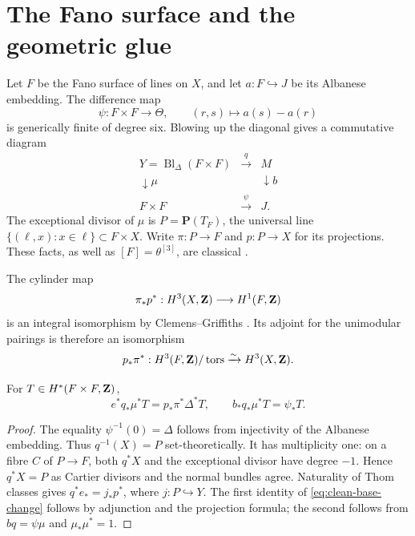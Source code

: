 \section{The Fano surface and the geometric glue}\label{sec:geometric-glue}

Let \(F\) be the Fano surface of lines on \(X\), and let
\(a:F\hookrightarrow J\) be its Albanese embedding.  The difference map
\[
 \psi:F\times F\longrightarrow\Theta,
 \qquad (r,s)\longmapsto a(s)-a(r)
\]
is generically finite of degree six.  Blowing up the diagonal gives a
commutative diagram
\[
 \begin{array}{ccc}
 Y=\operatorname{Bl}_{\Delta}(F\times F)&\xrightarrow{q}&M\\
 \downarrow\mu&&\downarrow b\\
 F\times F&\xrightarrow{\psi}&J.
 \end{array}
\]
The exceptional divisor of \(\mu\) is
\(P=\mathbf P(T_F)\), the universal line
\(\{(\ell,x):x\in\ell\}\subset F\times X\).  Write
\(\pi:P\to F\) and \(p:P\to X\) for its projections.  These facts, as
well as \([F]=\theta^{[3]}\), are classical
\cite{ClemensGriffiths,BeauvilleTheta}.

The cylinder map
\[
 \pi_*p^*:H^3(X,\mathbf Z)\longrightarrow H^1(F,\mathbf Z)
\]
is an integral isomorphism by Clemens--Griffiths
\cite[\S2 and \S11]{ClemensGriffiths}.  Its adjoint for the unimodular
pairings is therefore an isomorphism
\begin{equation}\label{eq:cylinder-adjoint}
 p_*\pi^*:H^3(F,\mathbf Z)/\operatorname{tors}
 \xrightarrow{\sim}H^3(X,\mathbf Z).
\end{equation}

\begin{lemma}\label{lem:clean-base-change}
For \(T\in H^*(F\times F,\mathbf Z)\),
\begin{equation}\label{eq:clean-base-change}
 e^*q_*\mu^*T=p_*\pi^*\Delta^*T,
 \qquad
 b_*q_*\mu^*T=\psi_*T.
\end{equation}
\end{lemma}

\begin{proof}
The equality \(\psi^{-1}(0)=\Delta\) follows from injectivity of the
Albanese embedding.  Thus \(q^{-1}(X)=P\) set-theoretically.  It has
multiplicity one: on a fibre \(C\) of \(P\to F\), both \(q^*X\) and the
exceptional divisor have degree \(-1\).  Hence \(q^*X=P\) as Cartier
divisors and the normal bundles agree.  Naturality of Thom classes gives
\(q^*e_*=j_*p^*\), where \(j:P\hookrightarrow Y\).  The first identity of
\eqref{eq:clean-base-change} follows by adjunction and the projection
formula; the second follows from \(bq=\psi\mu\) and
\(\mu_*\mu^*=1\).
\end{proof}

